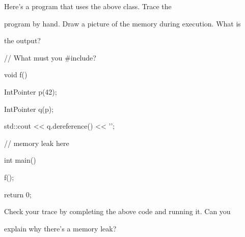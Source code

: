 Here's a program that uses the above class. Trace the

program by hand. Draw a picture of the memory during execution. What is

the output?



\begin{consolethree}[escapeinside=||]

// What must you #include?



void f()

{

    IntPointer p(42);

    IntPointer q(p);

    std::cout << q.dereference() << '\n';

    // memory leak here

}



int main()

{

    f();



    return 0;

}

\end{consolethree}



Check your trace by completing the above code and running it. Can you

explain why there's a memory leak?

